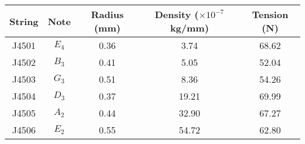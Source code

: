 \begin{tabular}{ccccc}
\toprule
String &   Note &  Radius (mm) &  Density ($\times 10^{-7}$ kg/mm) &  Tension (N) \\
\midrule
 J4501 &  $E_4$ &         0.36 &                              3.74 &        68.62 \\
 J4502 &  $B_3$ &         0.41 &                              5.05 &        52.04 \\
 J4503 &  $G_3$ &         0.51 &                              8.36 &        54.26 \\
 J4504 &  $D_3$ &         0.37 &                             19.21 &        69.99 \\
 J4505 &  $A_2$ &         0.44 &                             32.90 &        67.27 \\
 J4506 &  $E_2$ &         0.55 &                             54.72 &        62.80 \\
\bottomrule
\end{tabular}

